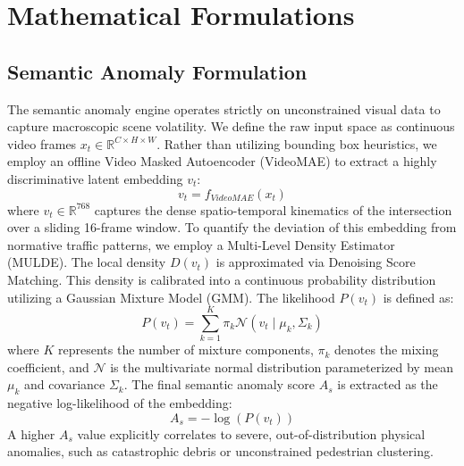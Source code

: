 \section{Mathematical Formulations}
\label{sec:mathematical_formulations}

\subsection{Semantic Anomaly Formulation}
The semantic anomaly engine operates strictly on unconstrained visual data to capture macroscopic scene volatility. We define the raw input space as continuous video frames $x_t \in \mathbb{R}^{C \times H \times W}$. Rather than utilizing bounding box heuristics, we employ an offline Video Masked Autoencoder (VideoMAE) to extract a highly discriminative latent embedding $v_t$:
\begin{equation}
v_t = f_{VideoMAE}(x_t)
\end{equation}
where $v_t \in \mathbb{R}^{768}$ captures the dense spatio-temporal kinematics of the intersection over a sliding 16-frame window. To quantify the deviation of this embedding from normative traffic patterns, we employ a Multi-Level Density Estimator (MULDE). The local density $D(v_t)$ is approximated via Denoising Score Matching. This density is calibrated into a continuous probability distribution utilizing a Gaussian Mixture Model (GMM). The likelihood $P(v_t)$ is defined as:
\begin{equation}
P(v_t) = \sum_{k=1}^{K} \pi_k \mathcal{N}(v_t \mid \mu_k, \Sigma_k)
\end{equation}
where $K$ represents the number of mixture components, $\pi_k$ denotes the mixing coefficient, and $\mathcal{N}$ is the multivariate normal distribution parameterized by mean $\mu_k$ and covariance $\Sigma_k$. The final semantic anomaly score $A_s$ is extracted as the negative log-likelihood of the embedding:
\begin{equation}
A_s = -\log(P(v_t))
\end{equation}
A higher $A_s$ value explicitly correlates to severe, out-of-distribution physical anomalies, such as catastrophic debris or unconstrained pedestrian clustering.

